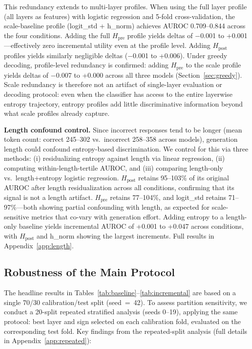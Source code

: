 \documentclass{ieeeaccess}
\newcommand{\Hpre}{H_{\text{pre}}}
\newcommand{\Hpost}{H_{\text{post}}}
\begin{document}
This redundancy extends to multi-layer profiles. When using the full layer profile (all layers as features) with logistic regression and 5-fold cross-validation, the scale-baseline profile (logit\_std + h\_norm) achieves AUROC 0.709--0.844 across the four conditions. Adding the full $\Hpre$ profile yields deltas of $-$0.001 to +0.001---effectively zero incremental utility even at the profile level. Adding $\Hpost$ profiles yields similarly negligible deltas ($-$0.001 to +0.006). Under greedy decoding, profile-level redundancy is confirmed: adding $\Hpre$ to the scale profile yields deltas of $-$0.007 to +0.000 across all three models (Section~\ref{sec:greedy}). Scale redundancy is therefore not an artifact of single-layer evaluation or decoding protocol: even when the classifier has access to the entire layerwise entropy trajectory, entropy profiles add little discriminative information beyond what scale profiles already capture.

\textbf{Length confound control.} Since incorrect responses tend to be longer (mean token count: correct 245--302 vs.\ incorrect 258--358 across models), generation length could confound entropy-based discrimination. We control for this via three methods: (i) residualizing entropy against length via linear regression, (ii) computing within-length-tertile AUROC, and (iii) comparing length-only vs.\ length+entropy logistic regression. $\Hpost$ retains 95--103\% of its original AUROC after length residualization across all conditions, confirming that its signal is not a length artifact. $\Hpre$ retains 77--104\%, and logit\_std retains 71--97\%---both showing partial confounding with length, as expected for scale-sensitive metrics that co-vary with generation effort. Adding entropy to a length-only baseline yields incremental AUROC of +0.001 to +0.047 across conditions, with $\Hpost$ and h\_norm showing the largest increments. Full results in Appendix~\ref{app:length}.

\FloatBarrier
\subsection{Robustness of the Main Protocol}
\label{sec:robustness}

The headline results in Tables~\ref{tab:baseline}--\ref{tab:incremental} are based on a single 70/30 calibration/test split (seed~=~42). To assess partition sensitivity, we conduct a 20-split repeated stratified analysis (seeds 0--19), applying the same protocol: best layer and sign selected on each calibration fold, evaluated on the corresponding test fold. Key findings from the repeated-split analysis (full details in Appendix~\ref{app:repeated}):
\end{document}
